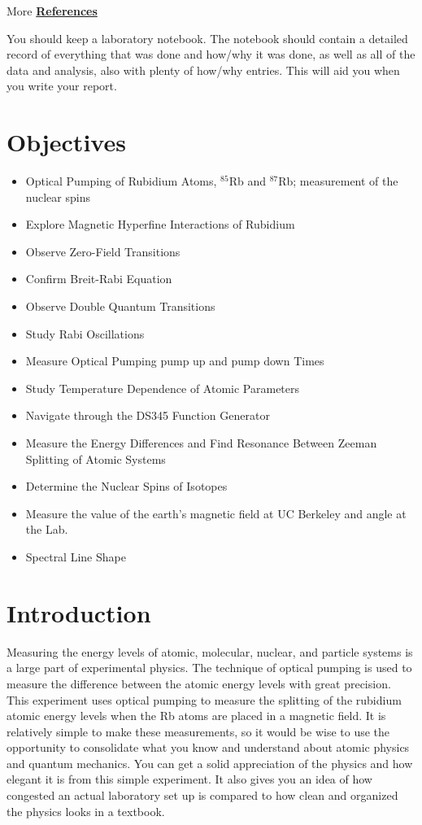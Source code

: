 \documentclass{../lab}
\begin{document}
\vspace{1em}

\noindent More \hyperref[references]{\textbf{References}}

\vspace{1em}

\noindent You should keep a laboratory notebook. The notebook should contain a detailed record of everything that was done and how/why it was done, as well as all of the data and analysis, also with plenty of how/why entries. This will aid you when you write your report.

\section{Objectives}
\begin{itemize}
    \item Optical Pumping of Rubidium Atoms, $^{85}$Rb and $^{87}$Rb; measurement of the nuclear spins
    \item Explore Magnetic Hyperfine Interactions of Rubidium
    \item Observe Zero-Field Transitions
    \item Confirm Breit-Rabi Equation
    \item Observe Double Quantum Transitions
    \item Study Rabi Oscillations
    \item Measure Optical Pumping pump up and pump down Times
    \item Study Temperature Dependence of Atomic Parameters
    \item Navigate through the DS345 Function Generator
    \item Measure the Energy Differences and Find Resonance Between Zeeman Splitting of Atomic Systems
    \item Determine the Nuclear Spins of Isotopes
    \item Measure the value of the earth's magnetic field at UC Berkeley and angle at the Lab.
    \item Spectral Line Shape
\end{itemize}

\section{Introduction}

Measuring the energy levels of atomic, molecular, nuclear, and particle systems is a large part of experimental physics. The technique of optical pumping is used to measure the difference between the atomic energy levels with great precision. This experiment uses optical pumping to measure the splitting of the rubidium atomic energy levels when the Rb atoms are placed in a magnetic field. It is relatively simple to make these measurements, so it would be wise to use the opportunity to consolidate what you know and understand about atomic physics and quantum mechanics. You can get a solid appreciation of the physics and how elegant it is from this simple experiment. It also gives you an idea of how congested an actual laboratory set up is compared to how clean and organized the physics looks in a textbook.
\end{document}
